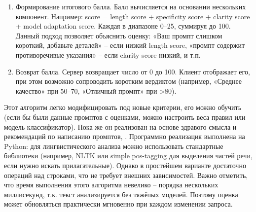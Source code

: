 \begin{enumerate}[label=\arabic*]
    \item Формирование итогового балла. Балл вычисляется на основании нескольких компонент. Например: score = length score + specificity score + clarity score + model adaptation score. Каждая в диапазоне 0–25, суммируя до 100. Данный подход позволяет объяснить оценку: «Ваш промпт слишком короткий, добавьте деталей» – если низкий length score, «промпт содержит противоречивые указания» – если clarity score низкий, и т.п.
    \item Возврат балла. Сервер возвращает число от 0 до 100. Клиент отображает его, при этом возможно сопроводить коротким вердиктом (например, «Среднее качество» при 50–70, «Отличный промпт» при >80).
\end{enumerate}
Этот алгоритм легко модифицировать под новые критерии, его можно обучить (если бы были данные промптов с оценками, можно настроить веса правил или модель классификатор). Пока же он реализован на основе здравого смысла и рекомендаций по написанию промптов\cite{vc:prompt}, \cite{promptingguide:basics}. Программно реализация выполнена на Python: для лингвистического анализа можно использовать стандартные библиотеки (например, NLTK или simple pos-tagging для выделения частей речи, если нужно искать прилагательные). Однако в простейшем варианте достаточно операций над строками, что не требует внешних зависимостей. Важно отметить, что время выполнения этого алгоритма невелико – порядка нескольких миллисекунд, т.к. текст анализируется без тяжёлых моделей. Поэтому оценка может обновляться практически мгновенно при каждом изменении запроса.

